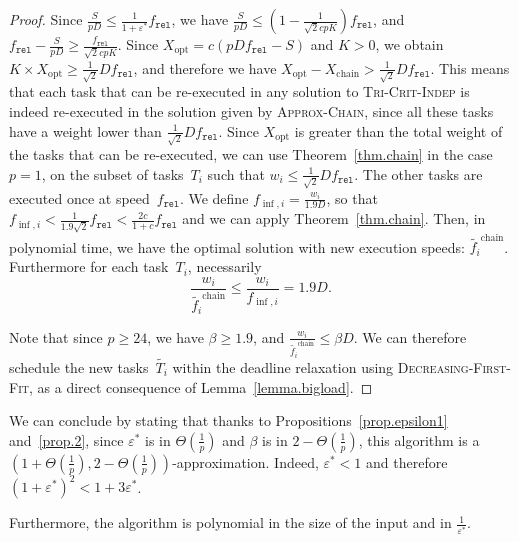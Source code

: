 \documentclass[a4paper]{article}
\theoremstyle{plain}
\theoremstyle{definition}
\theoremstyle{remark}
\newcommand{\finf}{\ensuremath{f_{\inf,i}}\xspace}
\newcommand{\fr}{\ensuremath{f_{\texttt{rel}}}\xspace}
\newcommand{\dff}{\textsc{Dec\-reasing-First-Fit}\xspace}
\newcommand{\approxchain}{\textsc{Ap\-prox-Chain}}
\newcommand{\indep}{\textsc{Tri-Crit-In\-dep}\xspace}
\begin{document}
\begin{proof}
Since $\frac{S}{pD}\leq  \frac{1}{1+\varepsilon^*} \fr$, we have
 $\frac{S}{pD}\leq \left(1-\frac{1}{\sqrt{2} cpK}\right) \fr$, and
$\fr - \frac{S}{pD} \geq \frac{\fr}{\sqrt{2} cpK}$. Since
$X_{\text{opt}} = c(pD\fr -S)$ and $K>0$, we obtain
$K \times X_{\text{opt}}\geq \frac{1}{\sqrt{2}}D\fr$, 
and therefore we have 
$X_{\text{opt}} - X_{\text{chain}} >
\frac{1}{\sqrt{2}}D\fr$. This means that each task that can be
re-executed in any solution to \indep is indeed re-executed in the
solution given by \approxchain, since all these tasks have a weight
lower than $\frac{1}{\sqrt{2}}D\fr$. Since $X_{\text{opt}}$ is greater
than the total weight of the tasks that can be re-executed, we can use
Theorem~\ref{thm.chain} in the case $p=1$, on the subset of
tasks~$T_i$ such that $w_i\leq\frac{1}{\sqrt{2}}D\fr$. The other tasks
are executed once at speed~$\fr$. We define $\finf = \frac{w_i}{1.9
  D}$, so that $\finf < \frac{1}{1.9\sqrt{2}} \fr < \frac{2c}{1+c}
\fr$ and we can apply Theorem~\ref{thm.chain}.  Then, in polynomial
time, we have the optimal solution with new execution speeds:
$\tilde{f_i}^{\text{chain}}$.  Furthermore for each task~$T_i$,
necessarily $$\frac{w_i}{\tilde{f_i}^{\text{chain}}} \leq
\frac{w_i}{\finf} = 1.9 D.$$

Note that since $p\geq 24$, we have $\beta \geq 1.9$, and
$\frac{w_i}{\tilde{f_i}^{\text{chain}}} \leq \beta D$. We can
therefore schedule the new tasks~$\tilde{T_i}$ within the deadline
relaxation using \dff, as a direct consequence of
Lemma~\ref{lemma.bigload}. \end{proof}



We can conclude by stating that thanks to
Propositions~\ref{prop.epsilon1} and~\ref{prop.2}, since
$\varepsilon^*$ is in $\Theta(\frac{1}{p})$ and $\beta$ is in
$2-\Theta(\frac{1}{p})$, this algorithm is a
$(1+\Theta(\frac{1}{p}),2-\Theta(\frac{1}{p}))$-approximation. 
Indeed, $\varepsilon^*<1$ and therefore
$(1+\varepsilon^*)^2<1+3\varepsilon^*$.  


Furthermore, the algorithm is polynomial in the size of the input and
in $\frac{1}{\varepsilon^*}$.
\end{document}
